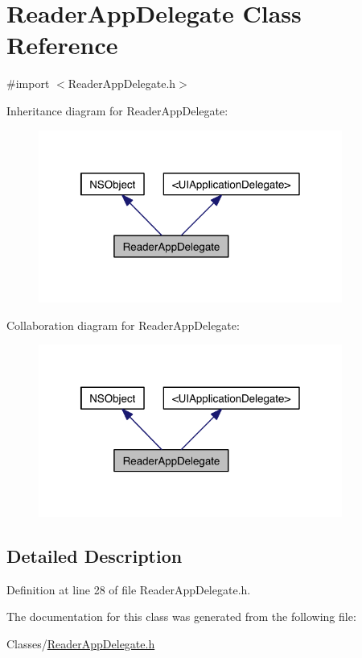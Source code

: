 \hypertarget{interface_reader_app_delegate}{\section{Reader\-App\-Delegate Class Reference}
\label{d5/d15/interface_reader_app_delegate}
}


{\ttfamily \#import $<$Reader\-App\-Delegate.\-h$>$}



Inheritance diagram for Reader\-App\-Delegate\-:
\nopagebreak
\begin{figure}[H]
\begin{center}
\leavevmode
\includegraphics[width=283pt]{d7/d91/interface_reader_app_delegate__inherit__graph}
\end{center}
\end{figure}


Collaboration diagram for Reader\-App\-Delegate\-:
\nopagebreak
\begin{figure}[H]
\begin{center}
\leavevmode
\includegraphics[width=283pt]{d2/d16/interface_reader_app_delegate__coll__graph}
\end{center}
\end{figure}


\subsection{Detailed Description}


Definition at line 28 of file Reader\-App\-Delegate.\-h.



The documentation for this class was generated from the following file\-:\begin{DoxyCompactItemize}
\item 
Classes/\hyperlink{_reader_app_delegate_8h}{Reader\-App\-Delegate.\-h}\end{DoxyCompactItemize}
